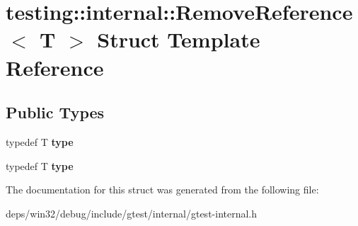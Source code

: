 \hypertarget{structtesting_1_1internal_1_1_remove_reference}{}\section{testing\+:\+:internal\+:\+:Remove\+Reference$<$ T $>$ Struct Template Reference}
\label{structtesting_1_1internal_1_1_remove_reference}
\subsection*{Public Types}
\begin{DoxyCompactItemize}
\item 
\hypertarget{structtesting_1_1internal_1_1_remove_reference_a9ca4f6499579225f7986b789ee4b2895}{}typedef T {\bfseries type}\label{structtesting_1_1internal_1_1_remove_reference_a9ca4f6499579225f7986b789ee4b2895}

\item 
\hypertarget{structtesting_1_1internal_1_1_remove_reference_a9ca4f6499579225f7986b789ee4b2895}{}typedef T {\bfseries type}\label{structtesting_1_1internal_1_1_remove_reference_a9ca4f6499579225f7986b789ee4b2895}

\end{DoxyCompactItemize}


The documentation for this struct was generated from the following file\+:\begin{DoxyCompactItemize}
\item 
deps/win32/debug/include/gtest/internal/gtest-\/internal.\+h\end{DoxyCompactItemize}
